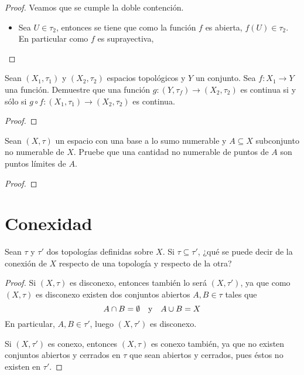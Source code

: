 \documentclass[12pt]{report}
\theoremstyle{largebreak}
\newcommand\cf[3]{\ensuremath{#1:#2\rightarrow#3}}
\begin{document}
    \begin{proof}
        Veamos que se cumple la doble contención.
        \begin{itemize}
            \item Sea $U\in\tau_2$, entonces se tiene que como la función $f$ es abierta, $f(U)\in\tau_2$. En particular como $f$ es suprayectiva, 
        \end{itemize}
    \end{proof}

    \begin{excer}
        Sean $(X_1,\tau_1)$ y $(X_2,\tau_2)$ espacios topológicos y $Y$ un conjunto. Sea $\cf{f}{X_1}{Y}$ una función. Demuestre que una función $\cf{g}{(Y,\tau_f)}{(X_2,\tau_2)}$ es continua si y sólo si $\cf{g\circ f}{(X_1,\tau_1)}{(X_2,\tau_2)}$ es continua.
    \end{excer}

    \begin{proof}
        
    \end{proof}

    \begin{excer}
        Sean $(X,\tau)$ un espacio con una base a lo sumo numerable y $A\subseteq X$ subconjunto no numerable de $X$. Pruebe que una cantidad no numerable de puntos de $A$ son puntos límites de $A$.
    \end{excer}

    \begin{proof}
        
    \end{proof}

    \section{Conexidad}

    \begin{excer}
        Sean $\tau$ y $\tau'$ dos topologías definidas sobre $X$. Si $\tau\subseteq \tau'$, ¿qué se puede decir de la conexión de $X$ respecto de una topología y respecto de la otra?
    \end{excer}

    \begin{proof}
        Si $(X,\tau)$ es disconexo, entonces también lo será $(X,\tau')$, ya que como $(X,\tau)$ es disconexo existen dos conjuntos abiertos $A,B\in\tau$ tales que
        \begin{equation*}
            A\cap B=\emptyset\quad\textup{y}\quad A\cup B=X
        \end{equation*}
        En particular, $A,B\in\tau'$, luego $(X,\tau')$ es disconexo.

        Si $(X,\tau')$ es conexo, entonces $(X,\tau)$ es conexo también, ya que no existen conjuntos abiertos y cerrados en $\tau$ que sean abiertos y cerrados, pues éstos no existen en $\tau'$.
    \end{proof}
\end{document}
